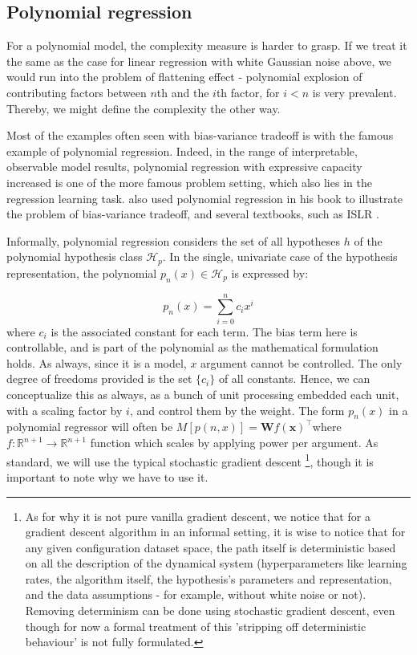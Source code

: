 \documentclass[10pt,oneside,oldfontcommands,dvipsnames,article]{memoir}
\begin{document}
\subsection{Polynomial regression}
For a polynomial model, the complexity measure is harder to grasp. If we treat it the same as the case for linear regression with white Gaussian noise above, we would run into the problem of flattening effect - polynomial explosion of contributing factors between $n$th and the $i$th factor, for $i<n$ is very prevalent. Thereby, we might define the complexity the other way. 

Most of the examples often seen with bias-variance tradeoff is with the famous example of polynomial regression. Indeed, in the range of interpretable, observable model results, polynomial regression with expressive capacity increased is one of the more famous problem setting, which also lies in the regression learning task. \cite{goodfellow2016deep} also used polynomial regression in his book to illustrate the problem of bias-variance tradeoff, and several textbooks, such as ISLR \cite{gareth_james_introduction_2013}. 

Informally, polynomial regression considers the set of all hypotheses $h$ of the polynomial hypothesis class $\mathcal{H}_{p}$. In the single, univariate case of the hypothesis representation, the polynomial $p_{n}(x)\in \mathcal{H}_{p}$ is expressed by: 

\begin{equation*}
    p_{n}(x)=\sum^{n}_{i=0}c_{i}x^{i}
\end{equation*}
where $c_{i}$ is the associated constant for each term. The bias term here is controllable, and is part of the polynomial as the mathematical formulation holds. As always, since it is a model, $x$ argument cannot be controlled. The only degree of freedoms provided is the set $\{ c_{i} \}$ of all constants. Hence, we can conceptualize this as always, as a bunch of unit processing embedded each unit, with a scaling factor by $i$, and control them by the weight. The form $p_{n}(x)$ in a polynomial regressor will often be $M[p(n,x)]=\mathbf{W}f(\mathbf{x})^{\top}$where $f:\mathbb{R}^{n+1}\to \mathbb{R}^{n+1}$ function which scales by applying power per argument. As standard, we will use the typical stochastic gradient descent \footnote{As for why it is not pure vanilla gradient descent, we notice that for a gradient descent algorithm in an informal setting, it is wise to notice that for any given configuration dataset space, the path itself is deterministic based on all the description of the dynamical system (hyperparameters like learning rates, the algorithm itself, the hypothesis's parameters and representation, and the data assumptions - for example, without white noise or not). Removing determinism can be done using stochastic gradient descent, even though for now a formal treatment of this 'stripping off deterministic behaviour' is not fully formulated. }, though it is important to note why we have to use it. 
\end{document}

